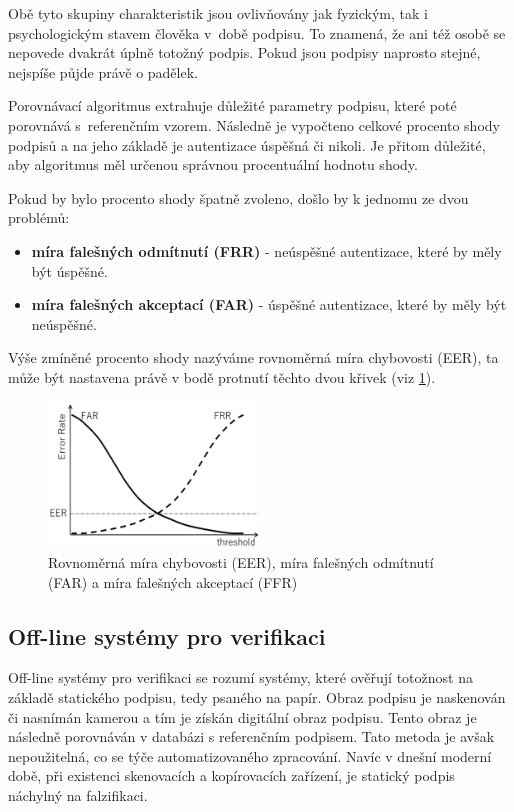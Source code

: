 Obě tyto skupiny charakteristik jsou ovlivňovány jak fyzickým, tak i psychologickým stavem člověka v~době podpisu.
To znamená, že ani též osobě se nepovede dvakrát úplně totožný podpis.
Pokud jsou podpisy naprosto stejné, nejspíše půjde právě o padělek.

Porovnávací algoritmus extrahuje důležité parametry podpisu, které poté porovnává s~referenčním vzorem. 
Následně je vypočteno celkové procento shody podpisů a na jeho základě je autentizace úspěšná či nikoli.
Je přitom důležité, aby algoritmus měl určenou správnou procentuální hodnotu shody. 

Pokud by bylo procento shody špatně zvoleno, došlo by k jednomu ze dvou problémů:
\begin{itemize}
  \item{\textbf{míra falešných odmítnutí (FRR)} - neúspěšné autentizace, které by měly být úspěšné.}
  \item{\textbf{míra falešných akceptací (FAR)} - úspěšné autentizace, které by měly být neúspěšné.}
\end{itemize}

Výše zmíněné procento shody nazýváme rovnoměrná míra chybovosti (EER), ta může být nastavena právě v bodě protnutí těchto dvou křivek (viz \ref{fig:FAR_FRR}).

\begin{figure}[h]
  \centering
  \includegraphics[width=0.5\textwidth]{obrazky-figures/FAR_FRR.png}
  \caption{Rovnoměrná míra chybovosti (EER), míra falešných odmítnutí (FAR) a míra falešných akceptací (FFR)} %
  \label{fig:FAR_FRR}
\end{figure}

\newpage

\subsection{Off-line systémy pro verifikaci}
Off-line systémy pro verifikaci se rozumí systémy, které ověřují totožnost na základě statického podpisu, tedy psaného na papír.  %
Obraz podpisu je naskenován či nasnímán kamerou a tím je získán digitální obraz podpisu.                                          %
Tento obraz je následně porovnáván v databázi s referenčním podpisem.                                                             %
Tato metoda je avšak nepoužitelná, co se týče automatizovaného zpracování.                                                        %
Navíc v dnešní moderní době, při existenci skenovacích a kopírovacích zařízení, je statický podpis náchylný na falzifikaci.             %

